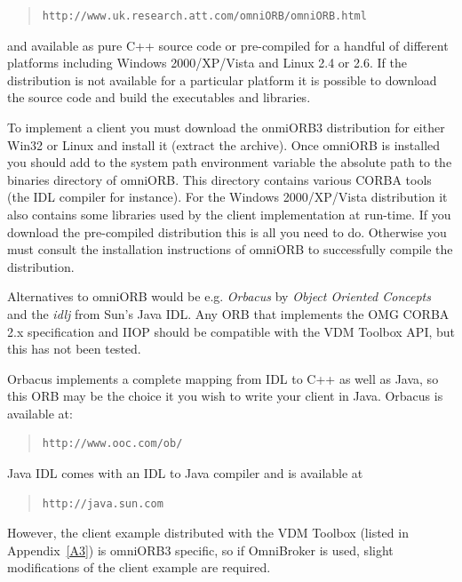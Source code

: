 \documentclass[\pformat,12pt]{article}
\begin{document}
\begin{quote}
\begin{verbatim}    
http://www.uk.research.att.com/omniORB/omniORB.html
\end{verbatim}
\end{quote}

and available as pure C++ source code or pre-compiled for a handful of
different platforms 
including Windows 2000/XP/Vista and Linux 2.4 or 2.6. If the distribution is not
available for a particular platform it is possible to download the
source code and build the executables and libraries.  

To implement a
client you must download the onmiORB3 distribution for either Win32 or
Linux and install it (extract the archive). Once omniORB is installed
you should add to the system path environment variable the absolute
path to the binaries directory of omniORB. This directory contains
various CORBA tools (the IDL compiler for instance). For the Windows
2000/XP/Vista distribution it also contains some libraries used by the client
implementation at run-time. If you download the pre-compiled
distribution this is all you need to do. Otherwise you must consult
the installation instructions of omniORB to successfully compile the
distribution.  

Alternatives to omniORB would be e.g. {\em Orbacus} by 
{\em Object Oriented Concepts} and the {\em idlj} from Sun's Java IDL. Any
ORB that implements the OMG CORBA 2.x specification and IIOP should be
compatible with the VDM Toolbox API, but this has not been tested.

Orbacus implements a complete mapping from IDL to
C++ as well as Java, so this ORB may be the choice it you wish to
write your client in Java. Orbacus is available at:

\begin{quote}
\begin{verbatim}    
http://www.ooc.com/ob/ 
\end{verbatim}
\end{quote}


Java IDL comes with an IDL to Java compiler and is available
at

\begin{quote}
\begin{verbatim}    
http://java.sun.com 
\end{verbatim}
\end{quote}

However, the client example distributed with
the VDM Toolbox (listed in Appendix~\ref{A3}) is omniORB3 specific, so
if OmniBroker is used, slight modifications of the client example are
required.
\end{document}
